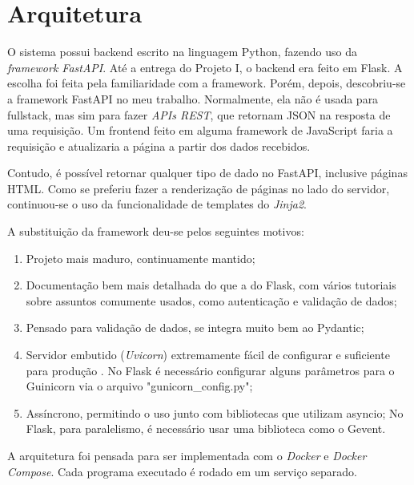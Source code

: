 \chapter{Arquitetura}

O sistema possui backend escrito na linguagem Python, 
fazendo uso da 
\textit{framework FastAPI}. Até a entrega do Projeto I, o backend era feito em Flask. 
A escolha foi feita pela familiaridade com a framework. Porém, depois, 
descobriu-se a framework FastAPI no meu trabalho. Normalmente, ela não é usada para 
fullstack, mas sim para fazer \textit{APIs REST}, que retornam JSON na resposta de uma 
requisição. Um frontend feito em alguma framework de JavaScript faria a requisição
 e atualizaria a página a partir dos dados recebidos.

Contudo, é possível retornar qualquer tipo de dado no FastAPI, inclusive páginas 
HTML. Como se preferiu fazer a renderização de páginas no lado do servidor, continuou-se
o uso da funcionalidade de templates do \textit{\textit{Jinja2}}.

A substituição da framework deu-se pelos seguintes motivos:

\begin{enumerate}
\item Projeto mais maduro, continuamente mantido;
\item Documentação bem mais detalhada do que a do Flask, com vários tutoriais sobre assuntos comumente usados, como autenticação e validação de dados;
\item Pensado para validação de dados, se integra muito bem ao Pydantic;
\item Servidor embutido (\textit{Uvicorn}) extremamente fácil de configurar e suficiente para produção \cite{fast-api-prod}.
No Flask é necessário configurar alguns parâmetros para o Guinicorn via o arquivo "gunicorn\_config.py";
\item Assíncrono, permitindo o uso junto com bibliotecas que utilizam asyncio;
No Flask, para paralelismo, é necessário usar uma biblioteca como o Gevent.
\end{enumerate}

A arquitetura foi pensada para ser implementada com o \textit{Docker} e \textit{Docker Compose}. Cada
programa executado é rodado em um serviço separado.

